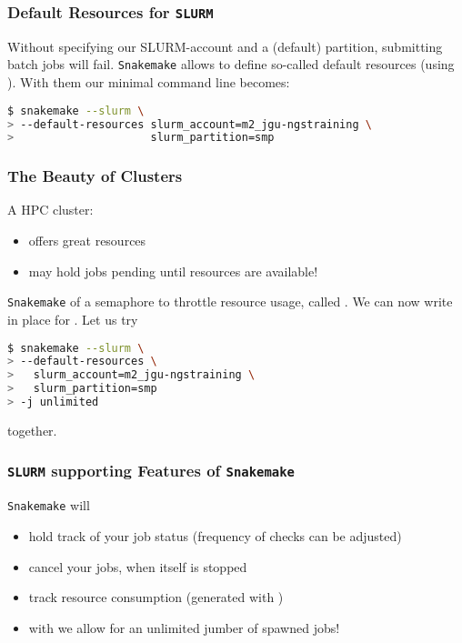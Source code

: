 \begin{frame}[fragile]
  \frametitle{Default Resources for \texttt{SLURM}}
  Without specifying our SLURM-account and a (default) partition, submitting batch jobs will fail. \texttt{Snakemake} allows to define so-called default resources (using ). With them our minimal command line becomes:
  \begin{lstlisting}[language=Bash, style=Shell, breaklines=true]
$ snakemake --slurm \
> --default-resources slurm_account=m2_jgu-ngstraining \
>                     slurm_partition=smp
  \end{lstlisting}
\end{frame}

\begin{frame}[fragile]
  \frametitle{The Beauty of Clusters}
  A HPC cluster:
  \begin{itemize}
   \item offers great resources
   \item may hold jobs pending until resources are available!
  \end{itemize}
  \pause
  \texttt{Snakemake} of a semaphore to throttle resource usage, called . We can now write  in place for . Let us try
  \begin{lstlisting}[language=Bash, style=Shell, basicstyle=\footnotesize]
$ snakemake --slurm \
> --default-resources \ 
>   slurm_account=m2_jgu-ngstraining \
>   slurm_partition=smp
> -j unlimited
  \end{lstlisting}
  together.
\end{frame}

\begin{frame}[fragile]
  \frametitle{\texttt{SLURM} supporting Features of \texttt{Snakemake}}
  \texttt{Snakemake} will
  \begin{itemize}[<+->]
   \item hold track of your job status (frequency of checks can be adjusted)
   \item cancel your jobs, when itself is stopped
   \item track resource consumption (generated with )
   \item with  we allow for an unlimited jumber of spawned jobs!
  \end{itemize}
  \pause
\end{frame}

